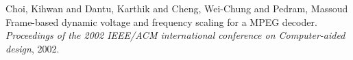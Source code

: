 \begin{thebibliography}{}


Choi, Kihwan and Dantu, Karthik and Cheng, Wei-Chung and Pedram, Massoud
Frame-based dynamic voltage and frequency scaling for a MPEG decoder.
\emph{Proceedings of the 2002 IEEE/ACM international conference on Computer-aided design},
2002.



\end{thebibliography}
